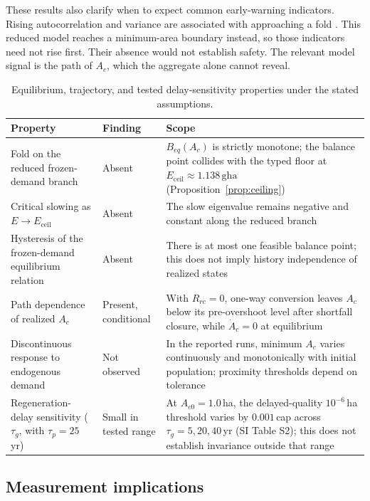 \documentclass[preprint,12pt,authoryear]{elsarticle}
\newcommand{\Eceil}{E_{\mathrm{ceil}}}
\begin{document}
These results also clarify when to expect common early-warning indicators. Rising autocorrelation and variance are associated with approaching a fold \citep{Scheffer2001}. This reduced model reaches a minimum-area boundary instead, so those indicators need not rise first. Their absence would not establish safety. The relevant model signal is the path of $A_c$, which the aggregate alone cannot reveal.

\begin{table}[!htbp]
\centering\footnotesize
\caption{Equilibrium, trajectory, and tested delay-sensitivity properties under the stated assumptions.}
\label{tab:neg}
\begin{tabularx}{\textwidth}{>{\raggedright\arraybackslash}p{} l >{\raggedright\arraybackslash}X}
\toprule
Property & Finding & Scope \\
\midrule
Fold on the reduced frozen-demand branch & Absent & $B_{eq}(A_c)$ is strictly monotone; the balance point collides with the typed floor at $\Eceil\approx1.138\,\mathrm{gha}$ (Proposition~\ref{prop:ceiling}) \\
Critical slowing as $E\to\Eceil$ & Absent & The slow eigenvalue remains negative and constant along the reduced branch \\
Hysteresis of the frozen-demand equilibrium relation & Absent & There is at most one feasible balance point; this does not imply history independence of realized states \\
Path dependence of realized $A_c$ & Present, conditional & With $R_{rc}=0$, one-way conversion leaves $A_c$ below its pre-overshoot level after shortfall closure, while $\dot A_c=0$ at equilibrium \\
Discontinuous response to endogenous demand & Not observed & In the reported runs, minimum $A_c$ varies continuously and monotonically with initial population; proximity thresholds depend on tolerance \\
Regeneration-delay sensitivity ($\tau_g$, with $\tau_p=25$\,yr) & Small in tested range & At $A_{c0}=1.0$\,ha, the delayed-quality $10^{-6}$\,ha threshold varies by $0.001$\,cap across $\tau_g=5,20,40$\,yr (SI Table S2); this does not establish invariance outside that range \\
\bottomrule
\end{tabularx}
\end{table}
\clearpage

\subsection{Measurement implications}
\end{document}
